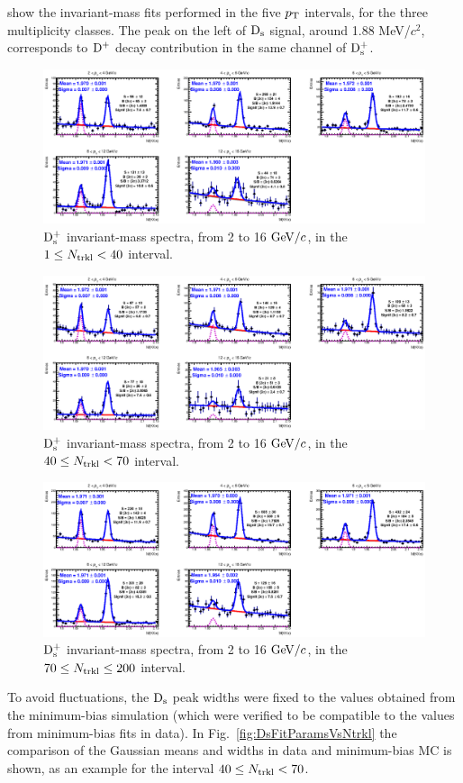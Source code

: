 show the invariant-mass fits performed in the five $p_{\rm T}$ intervals, for the three 
multiplicity classes. The peak on the left of ${\rm D_s}$ signal, around 1.88 MeV/$c^2$,
corresponds to ${\rm D^+}$ decay contribution in the same channel of ${\rm D_s^+}$.
\begin{figure}[htpb]
\centering
 \includegraphics[width=1\textwidth]{FigCap6/DsMass_140Trkl.eps}
  \caption{${\rm D_s^+}$ invariant-mass spectra, from 2 to 16 $\mathrm{GeV}/c$, in the $1 \leq N_{\rm trkl} < 40$ interval.}
 \label{fig:DsInvMassVsNtrkl_1}
\end{figure}
\begin{figure}[htpb]
\centering
 \includegraphics[width=1\textwidth]{FigCap6/DsMass_4070Trkl.eps}
  \caption{${\rm D_s^+}$ invariant-mass spectra, from 2 to 16 $\mathrm{GeV}/c$, in the $40 \leq N_{\rm trkl} < 70$ interval.}
 \label{fig:DsInvMassVsNtrkl_2}
\end{figure}
\begin{figure}[htpb]
\centering
 \includegraphics[width=1\textwidth]{FigCap6/DsMass_70200Trkl.eps}
  \caption{${\rm D_s^+}$ invariant-mass spectra, from 2 to 16 $\mathrm{GeV}/c$, in the $70 \leq N_{\rm trkl} \leq 200$ interval.}
 \label{fig:DsInvMassVsNtrkl_3}
\end{figure}
To avoid fluctuations, the ${\rm D_s}$ peak widths were fixed to the values obtained from the 
minimum-bias simulation (which were verified to be compatible to the values
from minimum-bias fits in data). In Fig.~\ref{fig:DsFitParamsVsNtrkl} 
the comparison of the Gaussian means and widths 
in data and minimum-bias MC is shown, as an example for the interval $40 \leq N_{\rm trkl} < 70$. 

